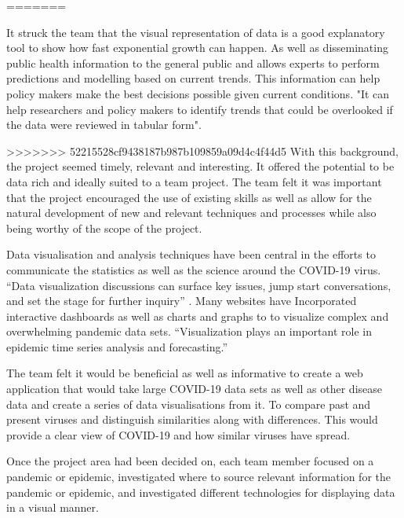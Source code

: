 \vspace{5mm}


=======


It struck the team that the visual representation of data is a good explanatory tool to show how fast exponential growth can happen. As well as disseminating public health information to the general public and allows experts to perform predictions and modelling based on current trends. This information can help policy makers make the best decisions possible given current conditions. "It can help researchers and policy makers to identify trends that could be overlooked if the data were reviewed in tabular form". \cite{tebe2020covid19}

\vspace{5mm}


>>>>>>> 52215528cf9438187b987b109859a09d4c4f44d5
With this background, the project seemed timely, relevant and interesting.
It offered the potential to be data rich and ideally suited to a team project. The team felt it was important that the project encouraged the use of existing skills as well as allow for the natural development of new and relevant techniques and processes while also being worthy of the scope of the project.

\vspace{5mm} %

Data visualisation and analysis techniques have been central in the efforts to communicate the statistics as well as the science around the COVID-19 virus. 
“Data visualization discussions can surface key issues, jump start conversations, and set the stage for further inquiry” \cite{fontichiaro2021using}. Many websites have Incorporated interactive dashboards as well as charts and graphs to to visualize complex and overwhelming pandemic data sets. 
“Visualization plays an important role in epidemic time series analysis and forecasting.”\cite{thorve2018epiviewer}

\vspace{5mm} %

The team felt it would be beneficial as well as informative to create a web application that would take large COVID-19 data sets as well as other disease data and create a series of data visualisations from it. To compare past and present viruses and distinguish similarities along with differences. This would provide a clear view of COVID-19 and how similar viruses have spread.

\vspace{3mm} %
Once the project area had been decided on, each team member focused on a pandemic or epidemic, investigated where to source relevant information for the pandemic or epidemic, and investigated different technologies for displaying data in a visual manner.

